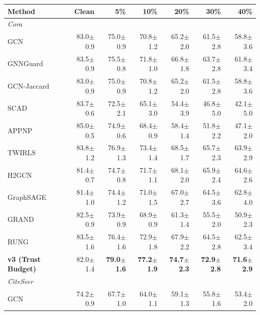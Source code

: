 \documentclass{article}
\newcommand{\score}[2]{#1{\scriptsize$\pm$#2}}
\begin{document}
\begin{center}
\scriptsize
\begin{tabular}{lrrrrrr}
\toprule
Method & Clean & 5\% & 10\% & 20\% & 30\% & 40\% \\
\midrule
\multicolumn{7}{l}{\textit{Cora}} \\
\midrule
GCN            & \score{83.0}{0.9} & \score{75.0}{0.9} & \score{70.8}{1.2} & \score{65.2}{2.0} & \score{61.5}{2.8} & \score{58.8}{3.6} \\
GNNGuard       & \score{83.5}{0.9} & \score{75.5}{0.8} & \score{71.8}{1.0} & \score{66.8}{1.8} & \score{63.7}{2.8} & \score{61.8}{3.4} \\
GCN-Jaccard    & \score{83.0}{0.9} & \score{75.0}{0.9} & \score{70.8}{1.2} & \score{65.2}{2.0} & \score{61.5}{2.8} & \score{58.8}{3.6} \\
SCAD           & \score{83.7}{0.6} & \score{72.5}{2.1} & \score{65.1}{3.0} & \score{54.4}{3.9} & \score{46.8}{5.0} & \score{42.1}{5.0} \\
APPNP          & \score{85.0}{0.5} & \score{74.9}{0.6} & \score{68.4}{0.9} & \score{58.4}{1.4} & \score{51.8}{2.2} & \score{47.1}{2.0} \\
TWIRLS         & \score{83.8}{1.2} & \score{76.9}{1.3} & \score{73.4}{1.4} & \score{68.5}{1.7} & \score{65.7}{2.3} & \score{63.9}{2.9} \\
H2GCN          & \score{81.4}{0.7} & \score{74.7}{0.8} & \score{71.7}{1.1} & \score{68.1}{2.0} & \score{65.9}{2.4} & \score{64.6}{2.6} \\
GraphSAGE      & \score{81.4}{1.0} & \score{74.4}{1.2} & \score{71.0}{1.5} & \score{67.0}{2.7} & \score{64.5}{3.6} & \score{62.8}{4.0} \\
GRAND          & \score{82.5}{0.9} & \score{73.9}{0.9} & \score{68.9}{0.9} & \score{61.3}{1.4} & \score{55.5}{2.0} & \score{50.9}{2.3} \\
RUNG           & \score{83.5}{1.6} & \score{76.4}{1.6} & \score{72.9}{1.8} & \score{67.9}{2.2} & \score{64.5}{2.8} & \score{62.5}{3.4} \\
\textbf{v3 (Trust Budget)} & \score{82.0}{1.4} & \textbf{\score{79.0}{1.6}} & \textbf{\score{77.2}{1.9}} & \textbf{\score{74.7}{2.3}} & \textbf{\score{72.9}{2.8}} & \textbf{\score{71.6}{2.9}} \\
\midrule
\multicolumn{7}{l}{\textit{CiteSeer}} \\
\midrule
GCN            & \score{74.2}{0.9} & \score{67.7}{1.0} & \score{64.0}{1.1} & \score{59.1}{1.3} & \score{55.8}{1.6} & \score{53.4}{2.0} \\

\end{tabular}
\end{center}
\end{document}
